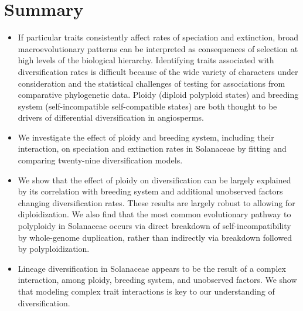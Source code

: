 \section{Summary}

\begin{itemize}
\item If particular traits consistently affect rates of speciation and extinction, broad macroevolutionary patterns can be interpreted as consequences of selection at high levels of the biological hierarchy.
Identifying traits associated with diversification rates is difficult because of the wide variety of characters under consideration and the statistical challenges of testing for associations from comparative phylogenetic data.
Ploidy (diploid \vs polyploid states) and breeding system (self-incompatible \vs self-compatible states) are both thought to be drivers of differential diversification in angiosperms. %

\item  We investigate the effect of ploidy and breeding system, including their interaction, on speciation and extinction rates in Solanaceae by fitting and comparing twenty-nine diversification models. %

\item We show that the effect of ploidy on diversification can be largely explained by its correlation with breeding system and additional unobserved factors changing diversification rates. %
These results are largely robust to allowing for diploidization.  %
We also find that the most common evolutionary pathway to polyploidy in Solanaceae occurs via direct breakdown of self-incompatibility by whole-genome duplication, rather than indirectly via breakdown followed by polyploidization.

\item  Lineage diversification in Solanaceae appears to be the result of a complex interaction, among ploidy, breeding system, and unobserved factors. 
We show that modeling complex trait interactions is key to our understanding of diversification.        %
\end{itemize}